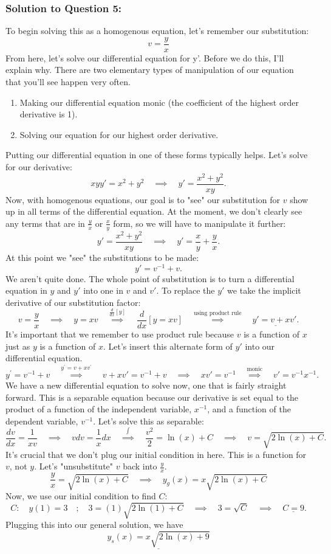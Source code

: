 \documentclass[a4paper,12pt]{article} %
\begin{document}
\subsubsection*{Solution to Question 5:}
To begin solving this as a homogenous equation, let's remember our substitution:
$$ \boxed{v = \frac{y}{x}} $$
From here, let's solve our differential equation for y'. Before we do this, I'll explain why. There are two elementary types of manipulation of our equation that you'll see happen very often. \begin{enumerate}
	\item Making our differential equation monic (the coefficient of the highest order derivative is 1).
	\item Solving our equation for our highest order derivative.
\end{enumerate}
Putting our differential equation in one of these forms typically helps. Let's solve for our derivative:
$$ xyy' = x^2 + y^2 \quad\implies \quad y' = \frac{x^2 + y^2}{xy}. $$
Now, with homogenous equations, our goal is to "see" our substitution for $v$ show up in all terms of the differential equation. At the moment, we don't clearly see any terms that are in $\frac{y}{x}$ or $\frac{x}{y}$ form, so we will have to manipulate it further:
$$ y'=\frac{x^2 + y^2}{xy} \quad\implies \quad y' = \frac{x}{y} + \frac{y}{x}.$$
At this point we "see" the substitutions to be made:
$$ y' = v^{-1} + v. $$
We aren't quite done. The whole point of substitution is to turn a differential equation in $y$ and $y'$ into one in $v$ and $v'$. To replace the $y'$ we take the implicit derivative of our substitution factor:
$$ v = \frac{y}{x} \quad\implies \quad y = xv \quad\overset{\frac{d}{dx}[y]}\implies \quad \frac{d}{dx}[y = xv] \quad\overset{\text{using product rule}}\implies \quad \underline{y' = v + xv'.}  $$
It's important that we remember to use product rule because $v$ is a function of $x$ just as $y$ is a function of $x$. Let's insert this alternate form of $y'$ into our differential equation.
$$ y^{\prime}=v^{-1}+v \quad\overset{y^{\prime}=v+x v^{\prime} }\implies \quad v + xv' = v^{-1} + v \quad\implies \quad xv' = v^{-1} \quad\overset{\text{monic}}\implies \quad v' = v^{-1}x^{-1}.$$
We have a new differential equation to solve now, one that is fairly straight forward. This is a separable equation because our derivative is set equal to the product of a function of the independent variable, $x^{-1}$, and a function of the dependent variable, $v^{-1}$. Let's solve this as separable:
$$ \frac{dv}{dx} = \frac{1}{xv} \quad\implies \quad vdv = \frac{1}{x}dx \quad\overset{\int}\implies \quad \frac{v^2}{2} = \ln{(x) + C} \quad\implies \quad v = \sqrt{2\ln{(x) + C}}. $$
It's crucial that we don't plug our initial condition in here. This is a function for $v$, not $y$. Let's "unsubstitute" $v$ back into $\frac{y}{x}$.
$$ \frac{y}{x} = \sqrt{2\ln{(x) + C}} \quad\implies \quad \boxed{y_g(x) = x\sqrt{2\ln{(x) + C}}} $$
Now, we use our initial condition to find $C$:
$$ C:\quad y(1)=3 \quad ; \quad 3 = (1)\sqrt{2\ln{(1)} + C} \quad\implies \quad 3 = \sqrt{C} \quad\implies \quad \underline{C = 9}. $$
Plugging this into our general solution, we have
$$\underline{\boxed{y_s(x) = x\sqrt{2\ln{(x)} + 9}}}$$
\end{document}

